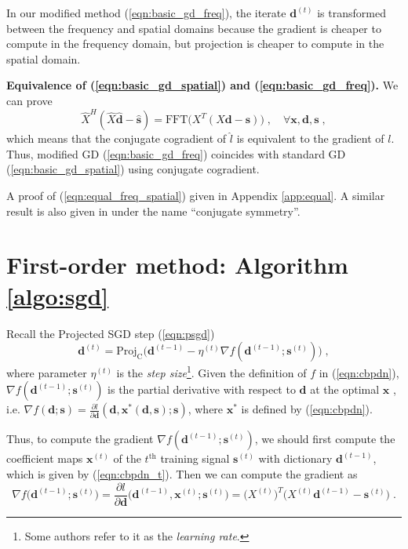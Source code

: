 \documentclass[final]{siamart1116}
\newcommand{\mb}[1]{\mathbf{#1}}
\begin{document}
In our modified method (\ref{eqn:basic_gd_freq}), the iterate $\mb{d}^{(t)}$ is transformed between the frequency and spatial domains because the gradient is cheaper to compute in the frequency domain, but projection is cheaper to compute in the spatial domain.

\textbf{Equivalence of (\ref{eqn:basic_gd_spatial}) and (\ref{eqn:basic_gd_freq}).} We can prove
\begin{equation}
\label{eqn:equal_freq_spatial}
\hat{X}^H(\hat{X} \hat{\mb{d}} - \hat{\mb{s}}) = \text{FFT}\big(X^T(X\mb{d}-\mb{s})\big)\; , \quad \forall \mb{x},\mb{d},\mb{s} \;,
\end{equation}
which means that the conjugate cogradient of $\hat{l}$ is equivalent to the gradient of $l$. Thus, modified GD (\ref{eqn:basic_gd_freq}) coincides with standard GD (\ref{eqn:basic_gd_spatial}) using conjugate cogradient.

A proof of (\ref{eqn:equal_freq_spatial}) given in Appendix \ref{app:equal}. A similar result is also given in \cite{rippel2015spectral} under the name ``conjugate symmetry''.





\section{First-order method: Algorithm \ref{algo:sgd}}
\label{sec:sgd}

Recall the Projected SGD step (\ref{eqn:psgd})
\[
\mb{d}^{(t)} = \text{Proj}_{\text{C}}\Big(\mb{d}^{(t-1)} - \eta^{(t)}\nabla f(\mb{d}^{(t-1)}; \mb{s}^{(t)}) \Big) \;,
\]
where parameter $\eta^{(t)}$ is the \emph{step size}\footnote{Some authors refer to it as the \emph{learning rate}.}. Given the definition of $f$ in (\ref{eqn:cbpdn}), $\nabla f(\mb{d}^{(t-1)}; \mb{s}^{(t)})$ is the partial derivative with respect to $\mb{d}$ at the optimal $\mb{x}$ \cite{mairal-2010-online,danskin1966theory}, i.e. $\nabla f(\mb{d};\mb{s}) = \frac{\partial l}{\partial \mb{d}} (\mb{d},\mb{x}^*(\mb{d},\mb{s}); \mb{s})$, where $\mb{x}^*$ is defined by (\ref{eqn:cbpdn}).

Thus, to compute the gradient $\nabla f(\mb{d}^{(t-1)}; \mb{s}^{(t)})$, we should first compute the coefficient maps $\mb{x}^{(t)}$ of the $t^{\mathrm{th}}$ training signal $\mb{s}^{(t)}$ with dictionary $\mb{d}^{(t-1)}$, which is given by (\ref{eqn:cbpdn_t}).  Then we can compute the gradient as
\[\nabla f\big(\mb{d}^{(t-1)}; \mb{s}^{(t)}\big) =\frac{\partial l}{\partial \mb{d}} \big(\mb{d}^{(t-1)},\mb{x}^{(t)}; \mb{s}^{(t)} \big) = \big(X^{(t)}\big)^T\Big(X^{(t)}\mb{d}^{(t-1)}-\mb{s}^{(t)}\Big) \;.
\]
\end{document}
